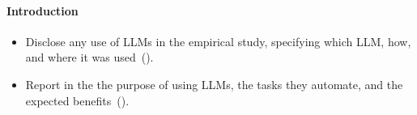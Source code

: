 \paragraph{\textbf{Introduction}}
\begin{itemize}[label={},leftmargin=*]
    \item \iconM Disclose any use of LLMs in the empirical study, specifying which LLM, how, and where it was used~().
    \item \iconS Report in the \paper the purpose of using LLMs, the tasks they automate, and the expected benefits~().
\end{itemize}

